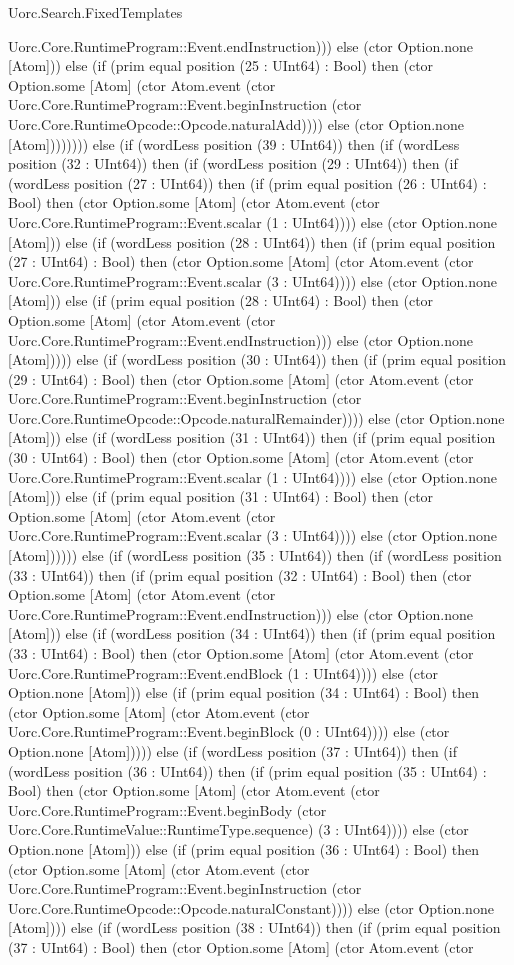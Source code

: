 \begin{lexlean}{Uorc.Search.FixedTemplates}
\begin{semanticmodule}
{Uorc.Core.RuntimeProgram::Event.endInstruction))) else (ctor Option.none [Atom])) else (if (prim equal position (25 : UInt64) : Bool) then (ctor Option.some [Atom] (ctor Atom.event (ctor Uorc.Core.RuntimeProgram::Event.beginInstruction (ctor Uorc.Core.RuntimeOpcode::Opcode.naturalAdd)))) else (ctor Option.none [Atom]))))))) else (if (wordLess position (39 : UInt64)) then (if (wordLess position (32 : UInt64)) then (if (wordLess position (29 : UInt64)) then (if (wordLess position (27 : UInt64)) then (if (prim equal position (26 : UInt64) : Bool) then (ctor Option.some [Atom] (ctor Atom.event (ctor Uorc.Core.RuntimeProgram::Event.scalar (1 : UInt64)))) else (ctor Option.none [Atom])) else (if (wordLess position (28 : UInt64)) then (if (prim equal position (27 : UInt64) : Bool) then (ctor Option.some [Atom] (ctor Atom.event (ctor Uorc.Core.RuntimeProgram::Event.scalar (3 : UInt64)))) else (ctor Option.none [Atom])) else (if (prim equal position (28 : UInt64) : Bool) then (ctor Option.some [Atom] (ctor Atom.event (ctor Uorc.Core.RuntimeProgram::Event.endInstruction))) else (ctor Option.none [Atom])))) else (if (wordLess position (30 : UInt64)) then (if (prim equal position (29 : UInt64) : Bool) then (ctor Option.some [Atom] (ctor Atom.event (ctor Uorc.Core.RuntimeProgram::Event.beginInstruction (ctor Uorc.Core.RuntimeOpcode::Opcode.naturalRemainder)))) else (ctor Option.none [Atom])) else (if (wordLess position (31 : UInt64)) then (if (prim equal position (30 : UInt64) : Bool) then (ctor Option.some [Atom] (ctor Atom.event (ctor Uorc.Core.RuntimeProgram::Event.scalar (1 : UInt64)))) else (ctor Option.none [Atom])) else (if (prim equal position (31 : UInt64) : Bool) then (ctor Option.some [Atom] (ctor Atom.event (ctor Uorc.Core.RuntimeProgram::Event.scalar (3 : UInt64)))) else (ctor Option.none [Atom]))))) else (if (wordLess position (35 : UInt64)) then (if (wordLess position (33 : UInt64)) then (if (prim equal position (32 : UInt64) : Bool) then (ctor Option.some [Atom] (ctor Atom.event (ctor Uorc.Core.RuntimeProgram::Event.endInstruction))) else (ctor Option.none [Atom])) else (if (wordLess position (34 : UInt64)) then (if (prim equal position (33 : UInt64) : Bool) then (ctor Option.some [Atom] (ctor Atom.event (ctor Uorc.Core.RuntimeProgram::Event.endBlock (1 : UInt64)))) else (ctor Option.none [Atom])) else (if (prim equal position (34 : UInt64) : Bool) then (ctor Option.some [Atom] (ctor Atom.event (ctor Uorc.Core.RuntimeProgram::Event.beginBlock (0 : UInt64)))) else (ctor Option.none [Atom])))) else (if (wordLess position (37 : UInt64)) then (if (wordLess position (36 : UInt64)) then (if (prim equal position (35 : UInt64) : Bool) then (ctor Option.some [Atom] (ctor Atom.event (ctor Uorc.Core.RuntimeProgram::Event.beginBody (ctor Uorc.Core.RuntimeValue::RuntimeType.sequence) (3 : UInt64)))) else (ctor Option.none [Atom])) else (if (prim equal position (36 : UInt64) : Bool) then (ctor Option.some [Atom] (ctor Atom.event (ctor Uorc.Core.RuntimeProgram::Event.beginInstruction (ctor Uorc.Core.RuntimeOpcode::Opcode.naturalConstant)))) else (ctor Option.none [Atom]))) else (if (wordLess position (38 : UInt64)) then (if (prim equal position (37 : UInt64) : Bool) then (ctor Option.some [Atom] (ctor Atom.event (ctor }
\end{semanticmodule}
\end{lexlean}
